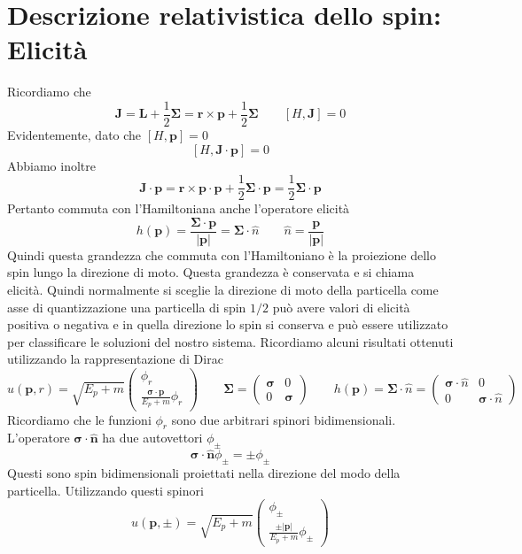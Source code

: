 \section{Descrizione relativistica dello spin: Elicità}
Ricordiamo che
$$
\mathbf{J} = \mathbf{L} + \frac{1}{2}\boldsymbol{\Sigma} = \mathbf{r} \times \mathbf{p} + \frac{1}{2}\boldsymbol{\Sigma} \qquad [H, \mathbf{J}] = 0
$$
Evidentemente, dato che $\left[H,\mathbf{p}\right]=0$
$$
[H, \mathbf{J} \cdot \mathbf{p}] = 0
$$
Abbiamo inoltre
$$
\mathbf{J} \cdot \mathbf{p} = \mathbf{r} \times \mathbf{p} \cdot \mathbf{p} + \frac{1}{2}\boldsymbol{\Sigma} \cdot \mathbf{p} = \frac{1}{2}\boldsymbol{\Sigma} \cdot \mathbf{p}
$$
Pertanto commuta con l'Hamiltoniana anche l'operatore elicità
$$
h(\mathbf{p}) = \frac{\boldsymbol{\Sigma} \cdot \mathbf{p}}{|\mathbf{p}|} = \boldsymbol{\Sigma} \cdot \hat{n} \qquad \hat{n} = \frac{\mathbf{p}}{|\mathbf{p}|}
$$
Quindi questa grandezza che commuta con l'Hamiltoniano è la proiezione dello spin lungo la direzione di moto. Questa grandezza è conservata e si chiama elicità.
Quindi normalmente si sceglie la direzione di moto della particella come asse di quantizzazione una particella di spin $1/2$ può avere valori di elicità positiva o negativa e in quella direzione lo spin si conserva e può essere utilizzato per classificare le soluzioni del nostro sistema.
Ricordiamo alcuni risultati ottenuti utilizzando la rappresentazione di Dirac
$$
u(\mathbf{p}, r) = \sqrt{E_p + m} \begin{pmatrix} \phi_r \\ \frac{\boldsymbol{\sigma} \cdot \mathbf{p}}{E_p + m} \phi_r \end{pmatrix} \qquad \boldsymbol{\Sigma} = \begin{pmatrix} \boldsymbol{\sigma} & 0 \\ 0 & \boldsymbol{\sigma} \end{pmatrix} \qquad h(\mathbf{p}) = \boldsymbol{\Sigma} \cdot \hat{n} = \begin{pmatrix} \boldsymbol{\sigma} \cdot \hat{n} & 0 \\ 0 & \boldsymbol{\sigma} \cdot \hat{n} \end{pmatrix}
$$
Ricordiamo che le funzioni $\phi_r$ sono due arbitrari spinori bidimensionali. L'operatore $\boldsymbol{\sigma}\cdot\hat{\mathbf{n}}$ ha due autovettori $\phi_\pm$
$$
\boldsymbol{\sigma} \cdot \hat{\mathbf{n}} \phi_\pm = \pm \phi_\pm
$$
Questi sono spin bidimensionali proiettati nella direzione del modo della particella. Utilizzando questi spinori
$$
u(\mathbf{p}, \pm) = \sqrt{E_p + m} \begin{pmatrix} \phi_\pm \\ \frac{\pm |\mathbf{p}|}{E_p + m} \phi_\pm \end{pmatrix}
$$

